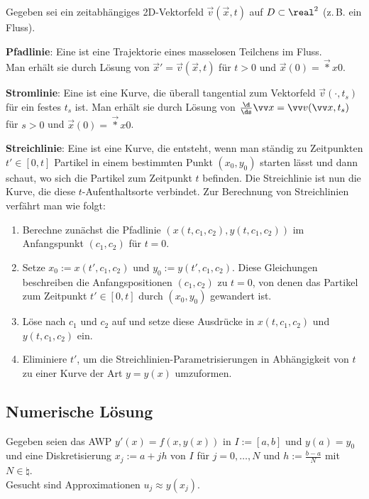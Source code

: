 Gegeben sei ein zeitabhängiges 2D-Vektorfeld $\vec{v}(\vec{x}, t)$ auf $D \subset \real^2$
(z.\,B. ein Fluss).

\textbf{Pfadlinie}:
Eine  ist eine Trajektorie eines masselosen Teilchens im Fluss.\\
Man erhält sie durch Lösung von $\vec{x}' = \vec{v}(\vec{x}, t)$ für $t > 0$ und
$\vec{x}(0) = \vec*{x}{0}$.

\textbf{Stromlinie}:
Eine  ist eine Kurve, die überall tangential zum
Vektorfeld $\vec{v}(\cdot, t_s)$ für ein festes $t_s$ ist.
Man erhält sie durch Lösung von $\frac{\d}{\ds}\vec{x} = \vec{v}(\vec{x}, t_s)$ für $s > 0$ und
$\vec{x}(0) = \vec*{x}{0}$.

\textbf{Streichlinie}:
Eine  ist eine Kurve, die entsteht, wenn man ständig zu Zeitpunkten
$t' \in [0, t]$ Partikel in einem bestimmten Punkt $(x_0, y_0)$ starten lässt 
und dann schaut, wo sich die Partikel zum Zeitpunkt $t$ befinden.
Die Streichlinie ist nun die Kurve, die diese $t$-Aufenthaltsorte verbindet.
Zur Berechnung von Streichlinien verfährt man wie folgt:
\begin{enumerate}
    \item
    Berechne zunächst die Pfadlinie $(x(t, c_1, c_2), y(t, c_1, c_2))$
    im Anfangspunkt $(c_1, c_2)$ für $t = 0$.
    
    \item
    Setze $x_0 := x(t', c_1, c_2)$ und $y_0 := y(t', c_1, c_2)$.
    Diese Gleichungen beschreiben die Anfangspositionen $(c_1, c_2)$ zu $t = 0$,
    von denen das Partikel zum Zeitpunkt $t' \in [0, t]$ durch $(x_0, y_0)$ gewandert ist.
    
    \item
    Löse nach $c_1$ und $c_2$ auf und setze diese Ausdrücke in $x(t, c_1, c_2)$ und
    $y(t, c_1, c_2)$ ein.
    
    \item
    Eliminiere $t'$, um die Streichlinien-Parametrisierungen in Abhängigkeit von $t$
    zu einer Kurve der Art $y = y(x)$ umzuformen.
\end{enumerate}

\subsection{%
    Numerische Lösung%
}

Gegeben seien das AWP $y'(x) = f(x, y(x))$ in $I := [a, b]$ und $y(a) = y_0$
und eine Diskretisierung $x_j := a + jh$ von $I$ für $j = 0, \dotsc, N$ und $h := \frac{b-a}{N}$
mit $N \in \natural$.\\
Gesucht sind Approximationen $u_j \approx y(x_j)$.

